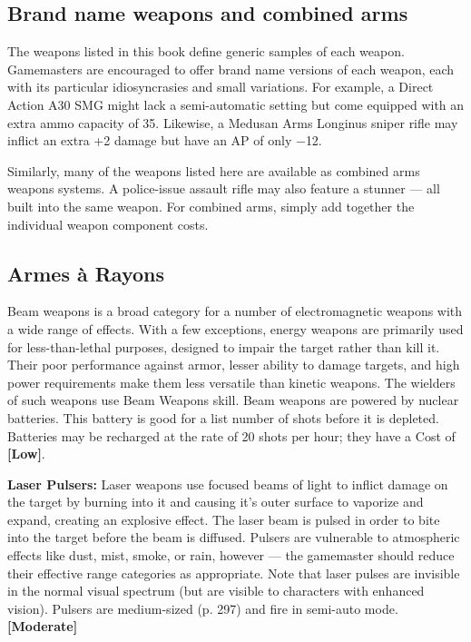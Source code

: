 \subsection{Brand name weapons and combined arms} \label{sec:brand-weapons-combined} 

The weapons listed in this book define generic samples of each weapon. Gamemasters are encouraged to offer brand name versions of each weapon, each with its particular idiosyncrasies and small variations. For example, a Direct Action A30 SMG might lack a semi-automatic setting but come equipped with an extra ammo capacity of 35. Likewise, a Medusan Arms Longinus sniper rifle may inflict an extra +2 damage but have an AP of only $-$12. 

Similarly, many of the weapons listed here are available as combined arms weapons systems. A police-issue assault rifle may also feature a stunner --- all built into the same weapon. For combined arms, simply add together the individual weapon component costs. 



\subsection{Armes à Rayons} \label{sec:beam-weapons} 

Beam weapons is a broad category for a number of electromagnetic weapons with a wide range of effects. With a few exceptions, energy weapons are primarily used for less-than-lethal purposes, designed to impair the target rather than kill it. Their poor performance against armor, lesser ability to damage targets, and high power requirements make them less versatile than kinetic weapons. The wielders of such weapons use Beam Weapons skill. Beam weapons are powered by nuclear batteries. This battery is good for a list number of shots before it is depleted. Batteries may be recharged at the rate of 20 shots per hour; they have a Cost of \textbf{[Low]}. 

\textbf{Laser Pulsers:} Laser weapons use focused beams of light to inflict damage on the target by burning into it and causing it’s outer surface to vaporize and expand, creating an explosive effect. The laser beam is pulsed in order to bite into the target before the beam is diffused. Pulsers are vulnerable to atmospheric effects like dust, mist, smoke, or rain, however --- the gamemaster should reduce their effective range categories as appropriate. Note that laser pulses are invisible in the normal visual spectrum (but are visible to characters with enhanced vision). Pulsers are medium-sized (p. 297) and fire in semi-auto mode. \textbf{[Moderate]} 

